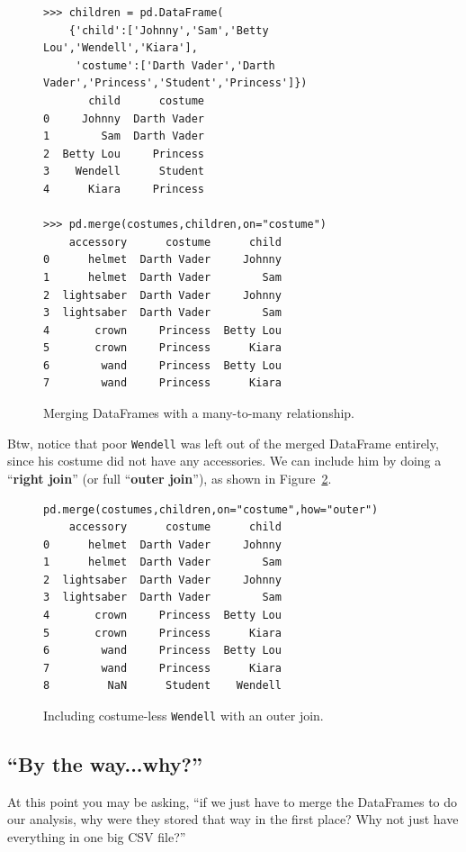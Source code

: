 \begin{enumerate}
\begin{figure}
\begin{Verbatim}[fontsize=\footnotesize,samepage=true,frame=single]
>>> children = pd.DataFrame(
    {'child':['Johnny','Sam','Betty Lou','Wendell','Kiara'],
     'costume':['Darth Vader','Darth Vader','Princess','Student','Princess']})
       child      costume
0     Johnny  Darth Vader
1        Sam  Darth Vader
2  Betty Lou     Princess
3    Wendell      Student
4      Kiara     Princess

>>> pd.merge(costumes,children,on="costume")
    accessory      costume      child
0      helmet  Darth Vader     Johnny
1      helmet  Darth Vader        Sam
2  lightsaber  Darth Vader     Johnny
3  lightsaber  Darth Vader        Sam
4       crown     Princess  Betty Lou
5       crown     Princess      Kiara
6        wand     Princess  Betty Lou
7        wand     Princess      Kiara
\end{Verbatim}
\caption{Merging DataFrames with a many-to-many relationship.}
\label{fig:costumes}
\end{figure}

Btw, notice that poor \texttt{Wendell} was left out of the merged DataFrame
entirely, since his costume did not have any accessories. We can include him
by doing a ``\textbf{right join}'' (or full ``\textbf{outer join}''), as shown
in Figure~\ref{fig:outerJoin}.

\begin{figure}
\begin{Verbatim}[fontsize=\footnotesize,samepage=true,frame=single]
pd.merge(costumes,children,on="costume",how="outer")
    accessory      costume      child
0      helmet  Darth Vader     Johnny
1      helmet  Darth Vader        Sam
2  lightsaber  Darth Vader     Johnny
3  lightsaber  Darth Vader        Sam
4       crown     Princess  Betty Lou
5       crown     Princess      Kiara
6        wand     Princess  Betty Lou
7        wand     Princess      Kiara
8         NaN      Student    Wendell
\end{Verbatim}
\caption{Including costume-less \texttt{Wendell} with an outer join.}
\label{fig:outerJoin}
\end{figure}

\end{enumerate}

\subsection{``By the way...why?''}

At this point you may be asking, ``if we just have to merge the DataFrames to
do our analysis, why were they stored that way in the first place? Why not
just have everything in one big CSV file?''

